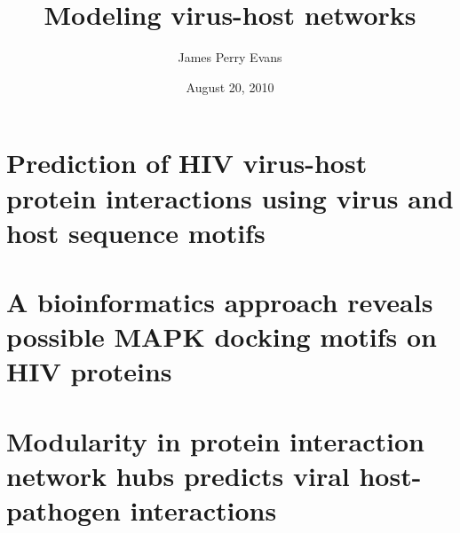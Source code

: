 \documentclass[12pt]{report}%
\begin{document}

  \clearpage

  \title{Modeling virus-host networks}

  \author{James Perry Evans}
  \date{August 20, 2010}



  \beforepreface
  

  \clearpage
  \abstractp

  

  \clearpage

  \tableofcontents

  \tablespagetrue
  \listoftables
  \figurespagetrue
  \listoffigures



  \clearpage

  
  \chapter{Prediction of HIV virus-host protein interactions using virus and host sequence motifs} \label{chapter:predict}
  
\chapter{A bioinformatics approach reveals possible MAPK docking motifs on HIV proteins} \label{chapter:mapk}
  
  \chapter{Modularity in protein interaction network hubs predicts viral host-pathogen interactions} \label{chapter:hubs}
   


  \appendix
  


  
  
\end{document}

